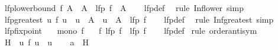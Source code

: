 \begin{isabellebody}
\isanewline
{}\isamarkupfalse%
\ lfp{\isacharunderscore}{\kern0pt}lowerbound{\isacharcolon}{\kern0pt}\ {\isachardoublequoteopen}f\ A\ {\isasymle}\ A\ {\isasymLongrightarrow}\ lfp\ f\ {\isasymle}\ A{\isachardoublequoteclose}\isanewline
%
\isadelimproof
\ \ %
\endisadelimproof
%
\isatagproof
{}\isamarkupfalse%
\ lfp{\isacharunderscore}{\kern0pt}def\ \isamarkupfalse%
\ {\isacharparenleft}{\kern0pt}rule\ Inf{\isacharunderscore}{\kern0pt}lower{\isacharparenright}{\kern0pt}\ simp%
\endisatagproof
{\isafoldproof}%
%
\isadelimproof
\isanewline
%
\endisadelimproof
\isanewline
{}\isamarkupfalse%
\ lfp{\isacharunderscore}{\kern0pt}greatest{\isacharcolon}{\kern0pt}\ {\isachardoublequoteopen}{\isacharparenleft}{\kern0pt}{\isasymAnd}u{\isachardot}{\kern0pt}\ f\ u\ {\isasymle}\ u\ {\isasymLongrightarrow}\ A\ {\isasymle}\ u{\isacharparenright}{\kern0pt}\ {\isasymLongrightarrow}\ A\ {\isasymle}\ lfp\ f{\isachardoublequoteclose}\isanewline
%
\isadelimproof
\ \ %
\endisadelimproof
%
\isatagproof
{}\isamarkupfalse%
\ lfp{\isacharunderscore}{\kern0pt}def\ \isamarkupfalse%
\ {\isacharparenleft}{\kern0pt}rule\ Inf{\isacharunderscore}{\kern0pt}greatest{\isacharparenright}{\kern0pt}\ simp%
\endisatagproof
{\isafoldproof}%
%
\isadelimproof
\isanewline
%
\endisadelimproof
\isanewline
{}\isamarkupfalse%
\isanewline
\isanewline
{}\isamarkupfalse%
\ lfp{\isacharunderscore}{\kern0pt}fixpoint{\isacharcolon}{\kern0pt}\isanewline
\ \ \ {\isachardoublequoteopen}mono\ f{\isachardoublequoteclose}\isanewline
\ \ \ {\isachardoublequoteopen}f\ {\isacharparenleft}{\kern0pt}lfp\ f{\isacharparenright}{\kern0pt}\ {\isacharequal}{\kern0pt}\ lfp\ f{\isachardoublequoteclose}\isanewline
%
\isadelimproof
\ \ %
\endisadelimproof
%
\isatagproof
{}\isamarkupfalse%
\ lfp{\isacharunderscore}{\kern0pt}def\isanewline
{}\isamarkupfalse%
\ {\isacharparenleft}{\kern0pt}rule\ order{\isacharunderscore}{\kern0pt}antisym{\isacharparenright}{\kern0pt}\isanewline
\ \ \isamarkupfalse%
\ {\isacharquery}{\kern0pt}H\ {\isacharequal}{\kern0pt}\ {\isachardoublequoteopen}{\isacharbraceleft}{\kern0pt}u{\isachardot}{\kern0pt}\ f\ u\ {\isasymle}\ u{\isacharbraceright}{\kern0pt}{\isachardoublequoteclose}\isanewline
\ \ \isamarkupfalse%
\ {\isacharquery}{\kern0pt}a\ {\isacharequal}{\kern0pt}\ {\isachardoublequoteopen}{\isasymSqinter}{\isacharquery}{\kern0pt}H{\isachardoublequoteclose}\isanewline

\end{isabellebody}
